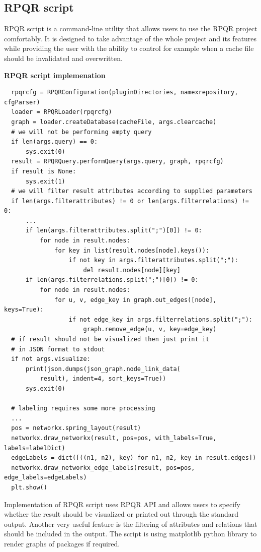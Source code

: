 \newpage

\subsection*{RPQR script}
RPQR script is a command-line utility that allows users to use the RPQR project comfortably. It is designed
to take advantage of the whole project and its features while providing the user with the ability to
control for example when a cache file should be invalidated and overwritten.

\textbf{RPQR script implemenation}

\begin{lstlisting}
  rpqrcfg = RPQRConfiguration(pluginDirectories, namexrepository, cfgParser)
  loader = RPQRLoader(rpqrcfg)
  graph = loader.createDatabase(cacheFile, args.clearcache)
  # we will not be performing empty query
  if len(args.query) == 0:
      sys.exit(0)
  result = RPQRQuery.performQuery(args.query, graph, rpqrcfg)
  if result is None:
      sys.exit(1)
  # we will filter result attributes according to supplied parameters
  if len(args.filterattributes) != 0 or len(args.filterrelations) != 0:
      ...
      if len(args.filterattributes.split(";")[0]) != 0:
          for node in result.nodes:
              for key in list(result.nodes[node].keys()):
                  if not key in args.filterattributes.split(";"):
                      del result.nodes[node][key]
      if len(args.filterrelations.split(";")[0]) != 0:
          for node in result.nodes:
              for u, v, edge_key in graph.out_edges([node], keys=True):
                  if not edge_key in args.filterrelations.split(";"):
                      graph.remove_edge(u, v, key=edge_key)
  # if result should not be visualized then just print it
  # in JSON format to stdout
  if not args.visualize:
      print(json.dumps(json_graph.node_link_data(
          result), indent=4, sort_keys=True))
      sys.exit(0)

  # labeling requires some more processing
  ...
  pos = networkx.spring_layout(result)
  networkx.draw_networkx(result, pos=pos, with_labels=True, labels=labelDict)
  edgeLabels = dict([((n1, n2), key) for n1, n2, key in result.edges])
  networkx.draw_networkx_edge_labels(result, pos=pos, edge_labels=edgeLabels)
  plt.show()
\end{lstlisting}

Implementation of RPQR script uses RPQR API and allows users to specify whether the result should be
visualized or printed out through the standard output. Another very useful feature is the filtering of
attributes and relations that should be included in the output. The script is using matplotlib python
library to render graphs of packages if required.


